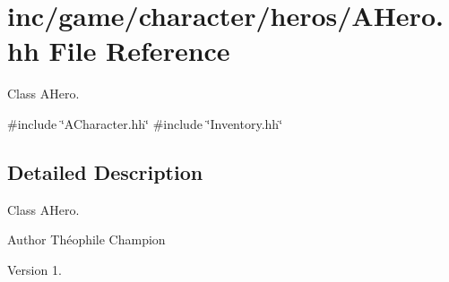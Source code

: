 \hypertarget{AHero_8hh}{}\section{inc/game/character/heros/\+A\+Hero.hh File Reference}
\label{AHero_8hh}


Class A\+Hero.  


{\ttfamily \#include \char`\"{}A\+Character.\+hh\char`\"{}}\newline
{\ttfamily \#include \char`\"{}Inventory.\+hh\char`\"{}}\newline


\subsection{Detailed Description}
Class A\+Hero. 

\begin{DoxyAuthor}{Author}
Théophile Champion 
\end{DoxyAuthor}
\begin{DoxyVersion}{Version}
1. 
\end{DoxyVersion}
